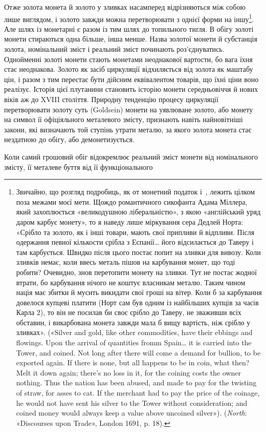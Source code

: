 Отже золота монета й золото у зливках насамперед відрізняються
між собою лише виглядом, і золото завжди можна перетворювати
з однієї форми на іншу\footnote{
Звичайно, що розгляд подробиць, як от монетний податок і~,
лежить цілком поза межами моєї мети. Щождо романтичного сикофанта
Адама Міллера, який захоплюється «великодушною ліберальністю», з
якою «англійський уряд даром карбує монету», то я наведу лише міркування
сера Дедлей Норта: «Срібло та золото, як і інші товари, мають свої
припливи й відпливи. Після одержання певної кількости срібла з Еспанії\dots{}
його відсилається до Таверу і там карбується. Швидко після цього постає
попит на зливки для вивозу. Коли зливків немає, коли ввесь металь пішов
на карбування монет, що тоді робити? Очевидно, знов перетопити монету
на зливки. Тут не постає жодної втрати, бо карбування нічого не коштує
власникам металю. Таким чином нація має збитки й мусить викидати
свої гроші на вітер. Коли б за карбування довелося купцеві платити
(Норт сам був одним із найбільших купців за часів Карла 2), то він не
посилав би своє срібло до Таверу, не зваживши всіх обставин, і викарбована
монета завжди мала б вищу вартість, ніж срібло у зливках». («Silver
and gold, like other commodities, have their ebbings and flowings. Upon
the arrival of quantities fromm Spain\dots{} it is carried into the Tower, and
coined. Not long after there will come a demand for bullion, to be exported
again. If there is none, but all happens to be in coin, what then? Melt
it down again; there’s no loss in it, for the coining costs the owner nothing.
Thus the nation has been abused, and made to pay for the twisting of
straw, for asses to cat. If the merchant had to pay the price of the coinage,
he would not have sent his silver to the Tower without consideration; and
coined money would always keep a value above uncoined silver»). (\emph{North}:
«Discourses upon Trade», London 1691, p. 18).
}. Але шлях із монетарні є разом
із тим шлях до топильного тиґля. В обігу золоті монети стираються
одна більше, інша менше. Назва золотої монети й субстанція
золота, номінальний зміст і реальний зміст починають роз’єднуватись.
Однойменні золоті монети стають монетами неоднакової
вартости, бо вага їхня стає неоднакова. Золото як засіб циркуляції
відхиляється від золота як маштабу цін, і разом з тим перестає
бути дійсним еквівалентом товарів, що їхні ціни воно реалізує.
Історія цієї плутанини становить історію монети середньовіччя
й нових віків аж до XVIII століття. Природну тенденцію процесу
циркуляції перетворювати золоту суть (Goldsein) монети на
уявлюване золото, або монету на символ її офіціяльного металевого
змісту, признають навіть найновітніші закони, які визначають
той ступінь утрати металю, за якого золота монета стає нездатною
до обігу, або демонетизується.

Коли самий грошовий обіг відокремлює реальний зміст монети
від номінального змісту, її металеве буття від її функціонального
\parbreak{}  %
